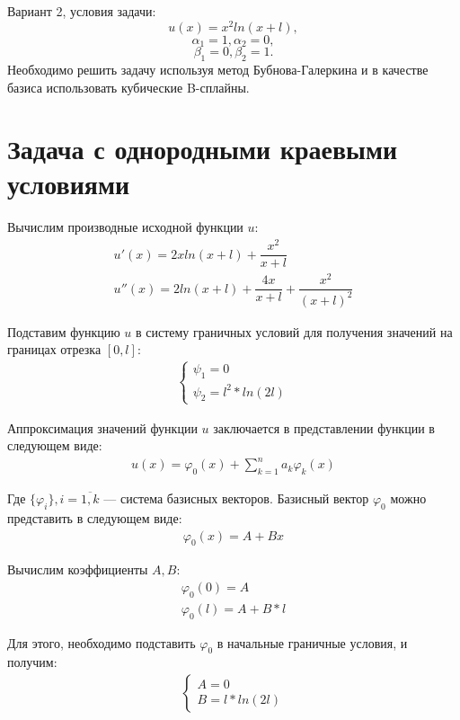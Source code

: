 \documentclass[12pt,a4paper,oneside]{extarticle}
\begin{document}
    Вариант 2, условия задачи:
    $$u(x) = x^2 ln(x+l),$$
    $$\alpha_1 = 1, \alpha_2 = 0,$$
    $$\beta_1 = 0, \beta_2 = 1.$$
    Необходимо решить задачу используя метод Бубнова-Галеркина и в качестве базиса использовать кубические B-сплайны.

\section{Задача с однородными краевыми условиями}
    Вычислим производные исходной функции $u$:
    \begin{gather}
        u'(x) = 2xln(x+l) + \dfrac{x^2}{x+l} \nonumber \\
        u''(x) = 2ln(x+l) + \dfrac{4x}{x+l} + \dfrac{x^2}{(x+l)^2} \nonumber
    \end{gather}

    Подставим функцию $u$ в систему граничных условий для получения значений на границах отрезка $[0, l]$:
    \begin{gather}
        \begin{cases}
            \psi_1 = 0 \nonumber \\
            \psi_2 = l^2*ln(2l) \nonumber
        \end{cases}
    \end{gather}
        
    Аппроксимация значений функции $u$ заключается в представлении функции в следующем виде:
    \begin{gather}
        u(x) = \varphi_0(x) + \sum\limits_{k=1}^{n} a_k\varphi_k(x) \nonumber
    \end{gather}
    
    Где $\{\varphi_i\}, i = \overline{1,k}$ --- система базисных векторов. 
    Базисный вектор $\varphi_0$ можно представить в следующем виде:
    \begin{gather}
        \varphi_0(x) = A + Bx \nonumber
    \end{gather}
    
    Вычислим коэффициенты $A, B$: 
    \begin{gather}
        \varphi_0(0) = A \nonumber \\
        \varphi_0(l) = A + B*l \nonumber
    \end{gather}
    
    Для этого, необходимо подставить $\varphi_0$ в начальные граничные условия, и получим:
    \begin{gather}
        \begin{cases}
            A = 0 \nonumber \\
            B = l*ln(2l) \nonumber
        \end{cases}
    \end{gather}
    
\end{document}
